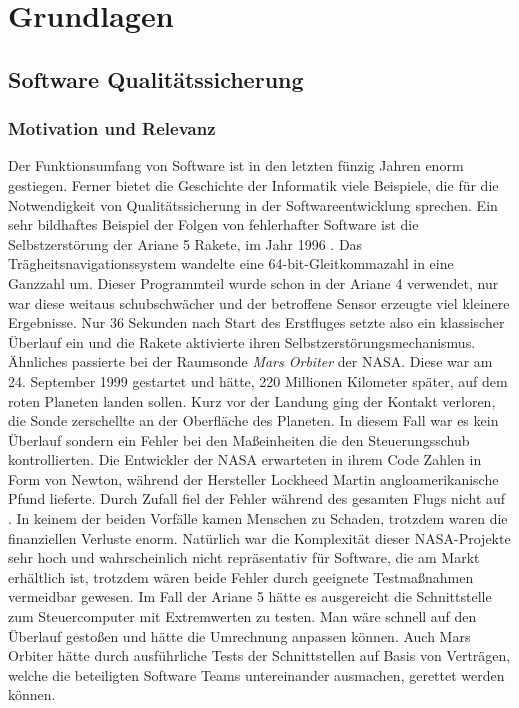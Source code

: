 \chapter{Grundlagen}
\label{sec:fundamentals}

\section{Software Qualitätssicherung}
\label{sec:software_quality}

\subsection{Motivation und Relevanz}
Der Funktionsumfang von Software ist in den letzten fünzig Jahren enorm gestiegen. Ferner bietet die Geschichte der Informatik viele Beispiele, die für die Notwendigkeit von Qualitätssicherung in der Softwareentwicklung sprechen. Ein sehr bildhaftes Beispiel der Folgen von fehlerhafter Software ist die Selbstzerstörung der Ariane 5 Rakete, im Jahr 1996 \cite{giese_warum_2002}. Das Trägheitsnavigationssystem wandelte eine 64-bit-Gleitkommazahl in eine Ganzzahl um. Dieser Programmteil wurde schon in der Ariane 4 verwendet, nur war diese weitaus schubschwächer und der betroffene Sensor erzeugte viel kleinere Ergebnisse. Nur 36 Sekunden nach Start des Erstfluges setzte also ein klassischer Überlauf ein und die Rakete aktivierte ihren Selbstzerstörungsmechanismus.
Ähnliches passierte bei der Raumsonde \textit{Mars Orbiter} der NASA. Diese war am 24. September 1999 gestartet und hätte, 220 Millionen Kilometer später, auf dem roten Planeten landen sollen. Kurz vor der Landung ging der Kontakt verloren, die Sonde zerschellte an der Oberfläche des Planeten. In diesem Fall war es kein Überlauf sondern ein Fehler bei den Maßeinheiten die den Steuerungsschub kontrollierten. Die Entwickler der NASA erwarteten in ihrem Code Zahlen in Form von Newton, während der Hersteller Lockheed Martin angloamerikanische Pfund lieferte. Durch Zufall fiel der Fehler während des gesamten Flugs nicht auf \cite{thaller_software-test:_2002}.
In keinem der beiden Vorfälle kamen Menschen zu Schaden, trotzdem waren die finanziellen Verluste enorm. Natürlich war die Komplexität dieser NASA-Projekte sehr hoch und wahrscheinlich nicht repräsentativ für Software, die am Markt erhältlich ist, trotzdem wären beide Fehler durch geeignete Testmaßnahmen vermeidbar gewesen. Im Fall der Ariane 5 hätte es ausgereicht die Schnittstelle zum Steuercomputer mit Extremwerten zu testen. Man wäre schnell auf den Überlauf gestoßen und hätte die Umrechnung anpassen können. Auch Mars Orbiter hätte durch ausführliche Tests der Schnittstellen auf Basis von Verträgen, welche die beteiligten Software Teams untereinander ausmachen, gerettet werden können.

